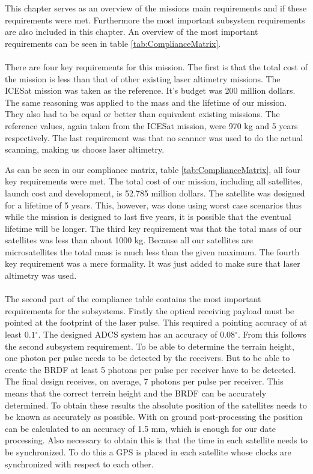 This chapter serves as an overview of the missions main requirements and if these requirements were met. Furthermore the most important subsystem requirements are also included in this chapter. An overview of the most important requirements can be seen in table \ref{tab:ComplianceMatrix}. 
\\\\
There are four key requirements for this mission. The first is that the total cost of the mission is less than that of other existing laser altimetry missions. The ICESat mission was taken as the reference. It's budget was 200 million dollars. The same reasoning was applied to the mass and the lifetime of our mission. They also had to be equal or better than equivalent existing missions. The reference values, again taken from the ICESat mission, were 970 kg and 5 years respectively. The last requirement was that no scanner was used to do the actual scanning, making us choose laser altimetry.

As can be seen in our compliance matrix, table \ref{tab:ComplianceMatrix}, all four key requirements were met. The total cost of our mission, including all satellites, launch cost and development, is 52.785 million dollars. The satellite was designed for a lifetime of 5 years. This, however, was done using worst case scenarios thus while the mission is designed to last five years, it is possible that the eventual lifetime will be longer. The third key requirement was that the total mass of our satellites was less than about 1000 kg. Because all our satellites are microsatellites the total mass is much less than the given maximum. The fourth key requirement was a mere formality. It was just added to make sure that laser altimetry was used. 
\\\\
The second part of the compliance table contains the most important requirements for the subsystems. Firstly the optical receiving payload must be pointed at the footprint of the laser pulse. This required a pointing accuracy of at least $0.1{}^{\circ}$. The designed ADCS system has an accuracy of $0.08{}^{\circ}$.
From this follows the second subsystem requirement. To be able to determine the terrain height, one photon per pulse needs to be detected by the receivers. But to be able to create the BRDF at least 5 photons per pulse per receiver have to be detected. The final design receives, on average, 7 photons per pulse per receiver. This means that the correct terrein height and the BRDF can be accurately determined.
To obtain these results the absolute position of the satellites needs to be known as accurately as possible. With on ground post-processing the position can be calculated to an accuracy of 1.5 mm, which is enough for our date processing. Also necessary to obtain this is that the time in each satellite needs to be synchronized. To do this a GPS is placed in each satellite whose clocks are synchronized with respect to each other.

